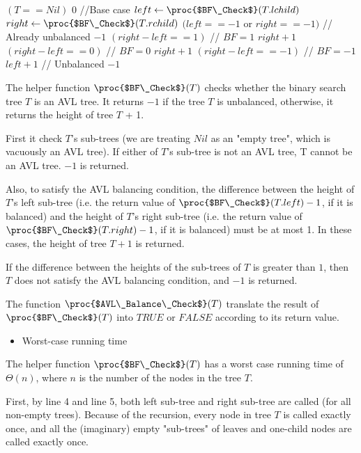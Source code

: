 \documentclass[11pt, answers]{exam}
\theoremstyle{plain}
\theoremstyle{definition}
\begin{document}
\begin{questions}
\begin{solution}
\begin{codebox}
\li \If $(T == Nil)$ 
\li     \Then \Return $0$ //Base case
\li \Else
\li     $left \gets \proc{$BF\_Check$}(T.lchild)$
\li     $right \gets \proc{$BF\_Check$}(T.rchild)$
\li     \If $(left == -1 $ or $ right == -1)$ // Already unbalanced
\li         \Then \Return $-1$ 
\li     \ElseIf $(right - left == 1)$       // $BF=1$
\li         \Then \Return $right+1$ 
\li     \ElseIf $(right - left == 0)$       // $BF=0$
\li         \Then \Return $right+1$ 
\li     \ElseIf $(right - left == -1)$      // $BF=-1$
\li         \Then \Return $left+1$ 
\li     \Else // Unbalanced
\li         \Return $-1$ \End \End
\end{codebox}

The helper function $\proc{$BF\_Check$}(T)$ checks whether the binary search tree $T$ is an AVL tree. It returns $-1$ if the tree $T$ is unbalanced, otherwise, it returns the height of tree $T$ + 1.

First it check $T$'s sub-trees (we are treating $Nil$ as an "empty tree", which is vacuously an AVL tree). If either of $T$'s sub-tree is not an AVL tree, T cannot be an AVL tree. $-1$ is returned.

Also, to satisfy the AVL balancing condition, the difference between the height of $T$'s left sub-tree (i.e. the return value of $\proc{$BF\_Check$}(T.left)-1$, if it is balanced) and the height of $T$'s right sub-tree (i.e. the return value of $\proc{$BF\_Check$}(T.right)-1$, if it is balanced) must be at most 1. In these cases, the height of tree $T + 1$ is returned. 

If the difference between the heights of the sub-trees of $T$ is greater than $1$, then $T$ does not satisfy the AVL balancing condition, and $-1$ is returned.

The function $\proc{$AVL\_Balance\_Check$}(T)$ translate the result of $\proc{$BF\_Check$}(T)$ into $TRUE$ or $FALSE$ according to its return value.
\begin{itemize}
\item Worst-case running time
\end{itemize}
The helper function $\proc{$BF\_Check$}(T)$ has a worst case running time of $\Theta(n)$, where $n$ is the number of the nodes in the tree $T$.

First, by line 4 and line 5, both left sub-tree and right sub-tree are called (for all non-empty trees). Because of the recursion, every node in tree $T$ is called exactly once, and all the (imaginary) empty "sub-trees" of leaves and one-child nodes are called exactly once.


\end{solution}
\end{questions}
\end{document}
